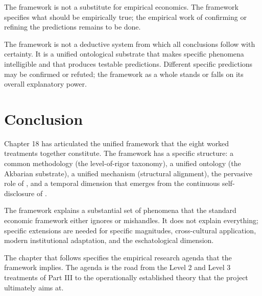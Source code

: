 The framework is not a substitute for empirical economics. The
framework specifies what should be empirically true; the empirical
work of confirming or refining the predictions remains to be
done.

The framework is not a deductive system from which all conclusions
follow with certainty. It is a unified ontological substrate that
makes specific phenomena intelligible and that produces testable
predictions. Different specific predictions may be confirmed or
refuted; the framework as a whole stands or falls on its overall
explanatory power.

\section{Conclusion}
\label{sec:unified-conclusion}

Chapter 18 has articulated the unified framework that the eight
worked treatments together constitute. The framework has a
specific structure: a common methodology (the level-of-rigor
taxonomy), a unified ontology (the Akbarian substrate), a
unified mechanism (structural alignment), the pervasive role of
, and a temporal dimension that emerges from the
continuous self-disclosure of .

The framework explains a substantial set of phenomena that the
standard economic framework either ignores or mishandles. It does
not explain everything; specific extensions are needed for
specific magnitudes, cross-cultural application, modern
institutional adaptation, and the eschatological dimension.

The chapter that follows specifies the empirical research agenda
that the framework implies. The agenda is the road from the
Level 2 and Level 3 treatments of Part III to the operationally
established theory that the project ultimately aims at.


